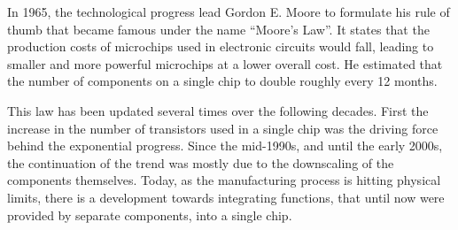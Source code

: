 
In 1965, the technological progress lead Gordon E. Moore to formulate
his rule of thumb that became famous under the name ``Moore's
Law''. It states that the production costs of microchips used in
electronic circuits would fall, leading to smaller and more powerful
microchips at a lower overall cost. He estimated that the number of
components on a single chip to double roughly every 12 months.

This law has been updated several times over the following
decades. First the increase in the number of transistors used in a
single chip was the driving force behind the exponential
progress. Since the mid-1990s, and until the early 2000s, the
continuation of the trend was mostly due to the downscaling of the
components themselves. Today, as the manufacturing process is hitting
physical limits, there is a development towards integrating functions,
that until now were provided by separate components, into a single
chip.

